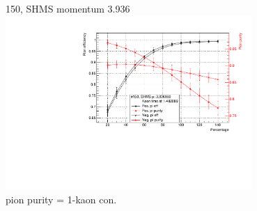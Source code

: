 \documentclass[aspectratio=169,xcolor=dvipsnames]{beamer}
\begin{document}
\begin{frame}{150, SHMS momentum 3.936}
\includegraphics[width = 0.7\textwidth]{results/pid/SHMS_rf_150_pos.pdf}
\\pion purity = 1-kaon con.
\end{frame}
\end{document}
